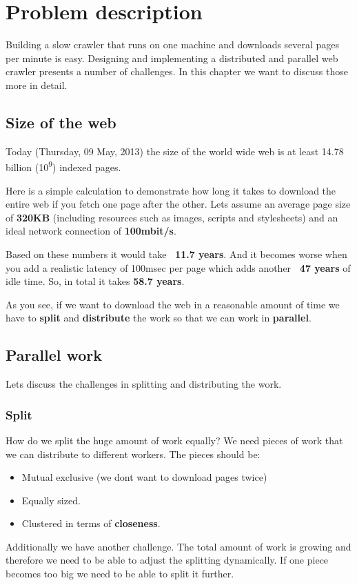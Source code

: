 \chapter{Problem description} %
Building a slow crawler that runs on one machine and downloads several pages per minute is easy. Designing and implementing a distributed and parallel web crawler presents a number of challenges. In this chapter we want to discuss those more in detail.

\label{Chapter3} %


\section{Size of the web}
Today (Thursday, 09 May, 2013) the size of the world wide web is at least 14.78 billion (10\textsuperscript{9}) indexed pages.\cite{wwwsize}

Here is a simple calculation to demonstrate how long it takes to download the entire web if you fetch one page after the other.
Lets assume an average page size of \textbf{320KB} \cite{webmetrics} (including resources such as images, scripts and stylesheets) and an ideal network connection of \textbf{100mbit/s}.

Based on these numbers it would take \textbf{~11.7 years}. And it becomes worse when you add a realistic latency of 100msec per page which adds another \textbf{~47 years} of idle time. So, in total it takes \textbf{58.7 years}.

As you see, if we want to download the web in a reasonable amount of time we have to \textbf{split} and \textbf{distribute} the work so that we can work in \textbf{parallel}.

\section{Parallel work}
Lets discuss the challenges in splitting and distributing the work.
\subsection{Split}
How do we split the huge amount of work equally? We need pieces of work that we can distribute to different workers. The pieces should be:
\begin{itemize}
\item Mutual exclusive (we dont want to download pages twice)
\item Equally sized.
\item Clustered in terms of \textbf{closeness}.
\end{itemize}
Additionally we have another challenge. The total amount of work is growing and therefore we need to be able to adjust the splitting dynamically. If one piece becomes too big we need to be able to split it further.
